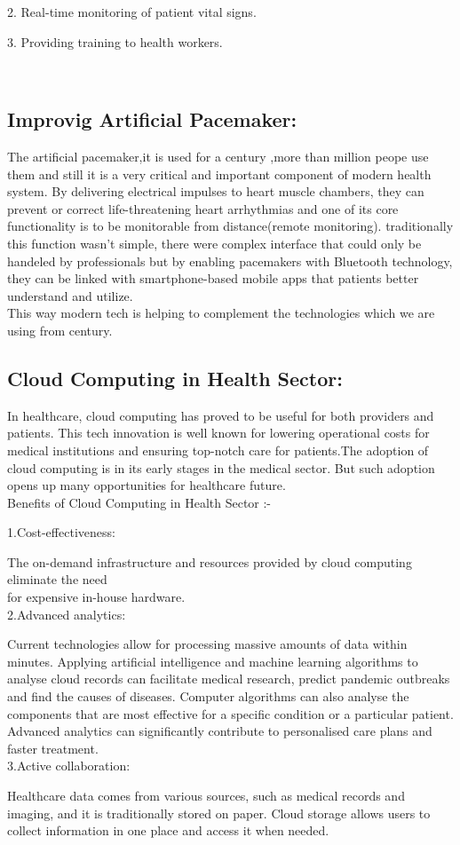 \documentclass[a4paper,12pt]{article}
\begin{document}
2. Real-time monitoring of patient vital signs.

3. Providing training to health workers.

\\

\subsection{Improvig Artificial Pacemaker:}
The artificial pacemaker,it is used for a century ,more than million peope use them and still it is a very critical and important component of modern health system. By delivering electrical
impulses to heart muscle chambers, they can prevent or correct life-threatening
heart arrhythmias and one of its core functionality is to be monitorable from distance(remote monitoring). traditionally this function wasn't simple, there were complex interface that could only be handeled by professionals but by enabling pacemakers with Bluetooth technology, they can be linked with smartphone-based mobile apps that patients better understand and utilize.
\\
This way modern tech is helping to complement the technologies which we are using from century.
\clearpage

\subsection{Cloud Computing in Health Sector:}
In healthcare, cloud computing has proved to be useful for both providers and patients. This tech innovation is well known for lowering operational costs for medical institutions and ensuring top-notch care for patients.The adoption of cloud computing is in its early stages in the medical sector. But such adoption opens up many opportunities for healthcare future.
\\

Benefits of Cloud Computing in Health Sector :-

1.Cost-effectiveness:

The on-demand infrastructure and resources provided by cloud computing eliminate the need 
\\ 
  for expensive in-house hardware.
\\

2.Advanced analytics:

Current technologies allow for processing massive amounts of data within minutes. Applying artificial intelligence and machine learning algorithms to analyse cloud records can facilitate medical research, predict pandemic outbreaks and find the causes of diseases. Computer algorithms can also analyse the components that are most effective for a specific condition or a particular patient. Advanced analytics can significantly contribute to personalised care plans and faster treatment.
\\

3.Active collaboration:

Healthcare data comes from various sources, such as medical records and imaging, and it is traditionally stored on paper. Cloud storage allows users to collect information in one place and access it when needed.
\end{document}
